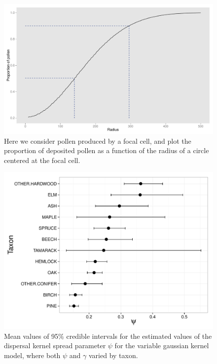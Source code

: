 \begin{figure}
\centering
\includegraphics[width=7in]{figures/dispersal_vs_distance.pdf}
\caption{Here we consider pollen produced by a focal cell, and plot the proportion of deposited pollen as a function of the radius of a circle centered at the focal cell.}
\label{fig:dvd}
\end{figure}

\begin{figure}
\centering
\includegraphics[width=7in]{figures/psi.pdf}
\caption{Mean values of 95\% credible intervals for the estimated values of the dispersal kernel spread parameter $\psi$ for the variable gaussian kernel model, where both $\psi$ and $\gamma$ varied by taxon.}
\label{fig:psi}
\end{figure}


